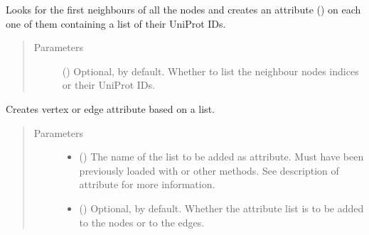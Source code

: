 \documentclass[letterpaper,10pt,english]{sphinxmanual}
\begin{document}
\begin{fulllineitems}

\begin{fulllineitems}
\label{\detokenize{reference:pypath.main.PyPath.all_neighbours}}
Looks for the first neighbours of all the nodes and creates an
attribute () on each one of them containing a
list of their UniProt IDs.
\begin{quote}\begin{description}
\item[{Parameters}] \leavevmode
{} () \textendash{} Optional,  by default. Whether to list the
neighbour nodes indices or their UniProt IDs.

\end{description}\end{quote}

\end{fulllineitems}


\begin{fulllineitems}
\label{\detokenize{reference:pypath.main.PyPath.apply_list}}
Creates vertex or edge attribute based on a list.
\begin{quote}\begin{description}
\item[{Parameters}] \leavevmode\begin{itemize}
\item {} 
 () \textendash{} The name of the list to be added as attribute. Must have
been previously loaded with
 or other methods.
See description of 
attribute for more information.

\item {} 
 () \textendash{} Optional,  by default. Whether the attribute list
is to be added to the nodes or to the edges.


\end{itemize}
\end{description}
\end{quote}
\end{fulllineitems}
\end{fulllineitems}
\end{document}

